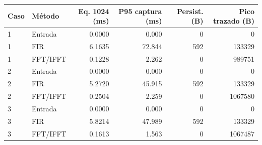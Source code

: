 \begin{tabular}{llrrrr}\toprule
Caso & Método & Eq. 1024 (ms) & P95 captura (ms) & Persist. (B) & Pico trazado (B)\\\midrule
1 & Entrada & 0.0000 & 0.000 & 0 & 0\\
1 & FIR & 6.1635 & 72.844 & 592 & 133329\\
1 & FFT/IFFT & 0.1228 & 2.262 & 0 & 989751\\
2 & Entrada & 0.0000 & 0.000 & 0 & 0\\
2 & FIR & 5.2720 & 45.915 & 592 & 133329\\
2 & FFT/IFFT & 0.2504 & 2.259 & 0 & 1067580\\
3 & Entrada & 0.0000 & 0.000 & 0 & 0\\
3 & FIR & 5.8214 & 47.989 & 592 & 133329\\
3 & FFT/IFFT & 0.1613 & 1.563 & 0 & 1067487\\
\bottomrule\end{tabular}
